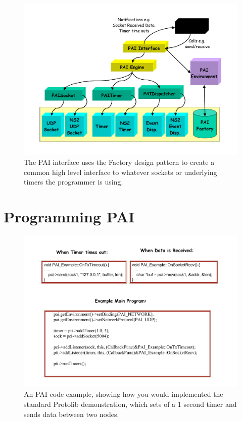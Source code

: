 \begin{figure}
\centering
\includegraphics[scale=0.4]{images/paiFactory}
\caption{The PAI interface uses the Factory design pattern to create
a common high level interface to whatever sockets or underlying timers
the programmer is using.} 
\label{pai:fig:factory}
\end{figure}


\section{Programming PAI}



\begin{figure}
\centering
\includegraphics[scale=0.4]{images/paiExample}
\caption{An PAI code example, showing how you would implemented the 
standard Protolib demonstration, which sets of a 1 second timer and sends
data between two nodes.} 
\label{pai:fig:example}
\end{figure}


